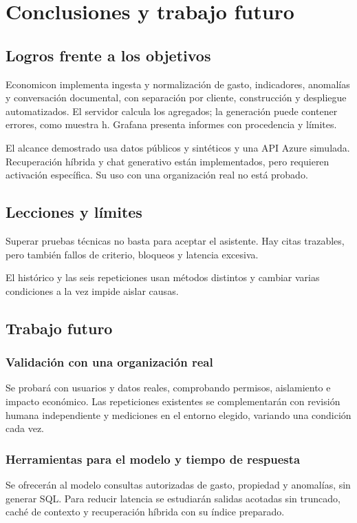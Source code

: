 \section{Conclusiones y trabajo futuro}\label{i-0}

\subsection{Logros frente a los objetivos}\label{i-1}

Economicon implementa ingesta y normalización de gasto, indicadores, anomalías y conversación documental, con separación por cliente, construcción y despliegue automatizados. El servidor calcula los agregados; la generación puede contener errores, como muestra h. Grafana presenta informes con procedencia y límites.

El alcance demostrado usa datos públicos y sintéticos y una API Azure simulada. Recuperación híbrida y chat generativo están implementados, pero requieren activación específica. Su uso con una organización real no está probado.

\subsection{Lecciones y límites}\label{i-2}

Superar pruebas técnicas no basta para aceptar el asistente. Hay citas trazables, pero también fallos de criterio, bloqueos y latencia excesiva. 

El histórico y las seis repeticiones usan métodos distintos y cambiar varias condiciones a la vez impide aislar causas.

\subsection{Trabajo futuro}\label{i-3}

\subsubsection{Validación con una organización real}
Se probará con usuarios y datos reales, comprobando permisos, aislamiento e impacto económico. Las repeticiones existentes se complementarán con revisión humana independiente y mediciones en el entorno elegido, variando una condición cada vez.

\subsubsection{Herramientas para el modelo y tiempo de respuesta}
Se ofrecerán al modelo consultas autorizadas de gasto, propiedad y anomalías, sin generar SQL. Para reducir latencia se estudiarán salidas acotadas sin truncado, caché de contexto y recuperación híbrida con su índice preparado.

